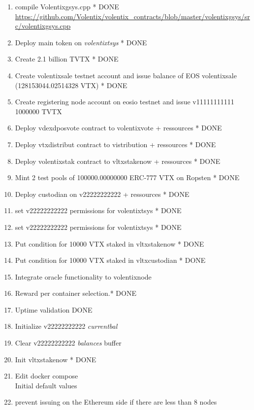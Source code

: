 \documentclass[]{article}
\begin{document}
  		\begin{enumerate}
  			\item compile Volentixgsys.cpp * {\color{green} DONE}\\ 
  			\url{https://github.com/Volentix/volentix_contracts/blob/master/volentixgsys/src/volentixgsys.cpp} 
  		  \item Deploy main token on \textit{volentixtsys} * {\color{green} DONE}
  		  \item Create 2.1 billion TVTX * {\color{green} DONE}
  		  \item Create volentixsale testnet account and issue balance of EOS volentixsale (128153044.02514328 VTX) * {\color{green} DONE}
  		   \item Create registering node account on eosio testnet and issue  v11111111111 1000000 TVTX 
  		  \item Deploy vdexdposvote contract to volentixvote + ressources * {\color{green} DONE}
  		  \item Deploy vtxdistribut contract to vistribution + ressources * {\color{green} DONE}
  		  \item Deploy volentixstak  contract to vltxstakenow + ressources * {\color{green} DONE}
 		  \item Mint 2 test pools of 100000.00000000 ERC-777 VTX on Ropsten  * {\color{green} DONE}
		  \item Deploy custodian on v22222222222 + ressources  * {\color{green} DONE}
		  \item set v22222222222 permissions for volentixtsys * {\color{green} DONE}
		  \item set v22222222222 permissions for volentixtsys * {\color{green} DONE}
		  \item Put condition for 10000 VTX staked in vltxstakenow * {\color{green} DONE}
		  \item Put condition for 10000 VTX staked in vltxcustodian  * {\color{green} DONE}
		   \item Integrate oracle functionality to volentixnode
		   \item Reward per container selection.* {\color{yellow} DONE}
		   \item Uptime validation {\color{yellow} DONE}
		  \item Initialize v22222222222 \textit{currentbal}
		  \item Clear v22222222222 \textit{balances} buffer
		  \item Init vltxstakenow * {\color{green} DONE}
		  \item Edit docker compose\\
		  Initial default values	 
		  \item prevent issuing on the Ethereum side if there are less than 8 nodes
		   
	 \end{enumerate}
\end{document}
